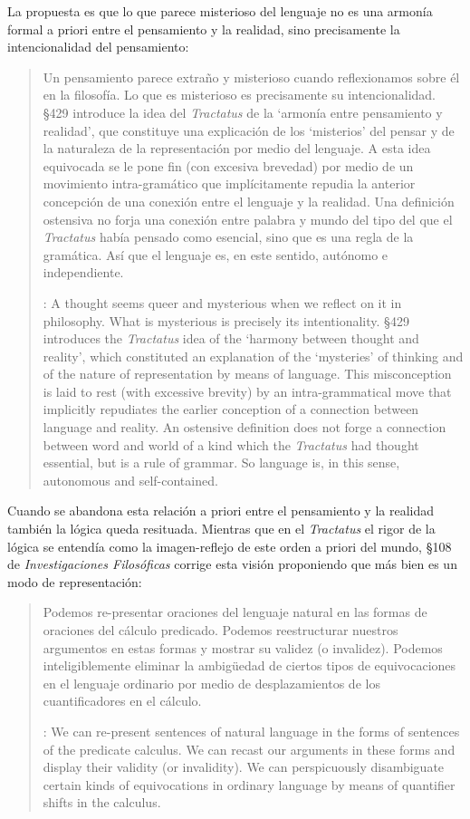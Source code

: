 La propuesta es que lo que parece misterioso del lenguaje no es una armonía formal a priori entre el pensamiento y la realidad, sino precisamente la intencionalidad del pensamiento: \blockquote[{\cite[4]{hacker2000mind}}: A thought seems queer and mysterious when we reflect on it in philosophy. What is mysterious is precisely its intentionality. \S429 introduces the \emph{Tractatus} idea of the `harmony between thought and reality', which constituted an explanation of the `mysteries' of thinking and of the nature of representation by means of language. This misconception is laid to rest (with excessive brevity) by an intra-grammatical move that implicitly repudiates the earlier conception of a connection between language and reality. An ostensive definition does not forge a connection between word and world of a kind which the \emph{Tractatus} had thought essential, but is a rule of grammar. So language is, in this sense, autonomous and self-contained.]{Un pensamiento parece extraño y misterioso cuando reflexionamos sobre él en la filosofía. Lo que es misterioso es precisamente su intencionalidad. \S429 introduce la idea del \emph{Tractatus} de la `armonía entre pensamiento y realidad', que constituye una explicación de los `misterios' del pensar y de la naturaleza de la representación por medio del lenguaje. A esta idea equivocada se le pone fin (con excesiva brevedad) por medio de un movimiento intra-gramático que implícitamente repudia la anterior concepción de una conexión entre el lenguaje y la realidad. Una definición ostensiva no forja una conexión entre palabra y mundo del tipo del que el \emph{Tractatus} había pensado como esencial, sino que es una regla de la gramática. Así que el lenguaje es, en este sentido, autónomo e independiente.}

Cuando se abandona esta relación a priori entre el pensamiento y la realidad también la lógica queda resituada. Mientras que en el \emph{Tractatus} el rigor de la lógica se entendía como la imagen-reflejo de este orden a priori del mundo, \S108 de \emph{Investigaciones Filosóficas} corrige esta visión proponiendo que más bien es un modo de representación: \blockquote[{\cite[242]{bakerhacker2009understanding}}: We can re-present sentences of natural language in the forms of sentences of the predicate calculus. We can recast our arguments in these forms and display their validity (or invalidity). We can perspicuously disambiguate certain kinds of equivocations in ordinary language by means of quantifier shifts in the calculus.]{Podemos re-presentar oraciones del lenguaje natural en las formas de oraciones del cálculo predicado. Podemos reestructurar nuestros argumentos en estas formas y mostrar su validez (o invalidez). Podemos inteligiblemente eliminar la ambigüedad de ciertos tipos de equivocaciones en el lenguaje ordinario por medio de desplazamientos de los cuantificadores en el cálculo.}

